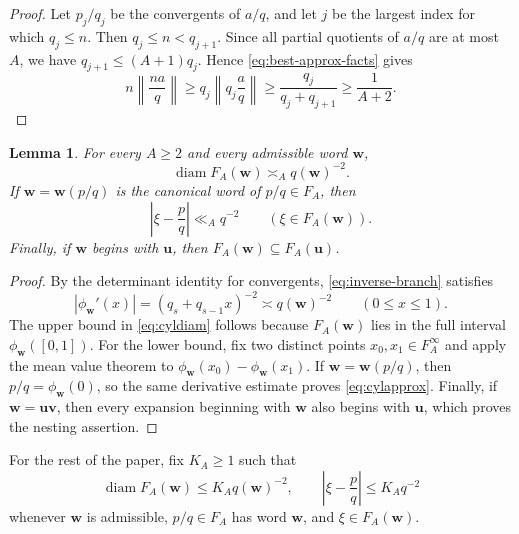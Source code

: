 \documentclass[11pt]{amsart}
\newtheorem{lemma}[theorem]{Lemma}
\newcommand{\diam}{\operatorname{diam}}
\begin{document}
\begin{proof}
Let $p_j/q_j$ be the convergents of $a/q$, and let $j$ be the largest
index for which $q_j\le n$.  Then $q_j\le n<q_{j+1}$.  Since all partial quotients of $a/q$ are at most $A$, we have
$q_{j+1}\le(A+1)q_j$.  Hence \eqref{eq:best-approx-facts} gives
$$
 n\left\|\frac{na}{q}\right\|
 \ge q_j\left\|q_j\frac aq\right\|
 \ge\frac{q_j}{q_j+q_{j+1}}
 \ge\frac1{A+2}.
$$
\end{proof}



\begin{lemma}\label{lem:cylapprox}
For every $A\ge2$ and every admissible word $\mathbf{w}$,
\begin{equation}\label{eq:cyldiam}
 \diam F_A(\mathbf{w})\asymp_A q(\mathbf{w})^{-2}.
\end{equation}
If $\mathbf{w}=\mathbf{w}(p/q)$ is the canonical word of $p/q\in F_A$, then
\begin{equation}\label{eq:cylapprox}
 \left|\xi-\frac pq\right|\ll_A q^{-2}
 \qquad(\xi\in F_A(\mathbf{w})).
\end{equation}
Finally, if $\mathbf{w}$ begins with $\mathbf{u}$, then $F_A(\mathbf{w})\subseteq F_A(\mathbf{u})$.
\end{lemma}

\begin{proof}
By the determinant identity for convergents, \eqref{eq:inverse-branch} satisfies
$$
 |\phi_{\mathbf{w}}'(x)|=(q_s+q_{s-1}x)^{-2}\asymp q(\mathbf{w})^{-2}
 \qquad(0\le x\le1).
$$
The upper bound in \eqref{eq:cyldiam} follows because $F_A(\mathbf{w})$ lies in the
full interval $\phi_{\mathbf{w}}([0,1])$.  For the lower bound, fix two distinct points
$x_0,x_1\in F_A^\infty$ and apply the mean value theorem to
$\phi_{\mathbf{w}}(x_0)-\phi_{\mathbf{w}}(x_1)$.  If $\mathbf{w}=\mathbf{w}(p/q)$, then $p/q=\phi_{\mathbf{w}}(0)$, so the same
derivative estimate proves \eqref{eq:cylapprox}.  Finally, if $\mathbf{w}=\mathbf{u}\mathbf{v}$, then every expansion beginning with $\mathbf{w}$ also begins
with $\mathbf{u}$, which proves the nesting assertion.
\end{proof}

For the rest of the paper, fix $K_A\ge1$ such that
\begin{equation}\label{eq:KA-choice}
 \diam F_A(\mathbf{w})\le K_Aq(\mathbf{w})^{-2},
 \qquad
 \left|\xi-\frac pq\right|\le K_Aq^{-2}
\end{equation}
whenever $\mathbf{w}$ is admissible, $p/q\in F_A$ has word $\mathbf{w}$, and
$\xi\in F_A(\mathbf{w})$.
\end{document}
